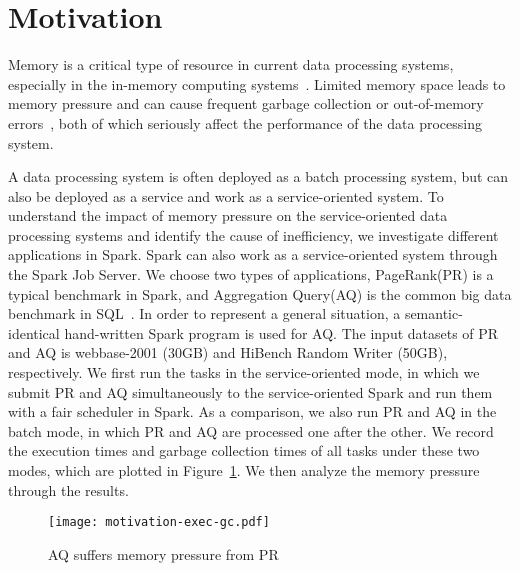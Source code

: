 \section{Motivation}
\label{sec:motivation}

Memory is a critical type of resource in current data processing systems, especially in the in-memory computing systems~\cite{shi:mammoth}. Limited memory space leads to memory pressure and can cause frequent garbage collection or out-of-memory errors~\cite{fang2015interruptible}, both of which seriously affect the performance of the data processing system.

A data processing system is often deployed as a batch processing system, but can also be deployed as a service and work as a service-oriented system. To understand the impact of memory pressure on the service-oriented data processing systems and identify the cause of inefficiency, we investigate different applications in Spark. Spark can also work as a service-oriented system through the Spark Job Server. We choose two types of applications, PageRank(PR)  
is a typical benchmark in Spark, and Aggregation Query(AQ) is the common big data benchmark in SQL~\cite{www:benchmark}. In order to represent a general situation, a semantic-identical hand-written Spark program is used for AQ. The input datasets of PR and AQ is webbase-2001 (30GB) and HiBench Random Writer (50GB), respectively. We first run the tasks in the service-oriented mode, in which we submit PR and AQ simultaneously to the service-oriented Spark and run them with a fair scheduler in Spark. As a comparison, we also run PR and AQ in the batch mode, in which PR and AQ are processed one after the other. We record the execution times and garbage collection times of all tasks under these two modes, which are plotted in Figure~\ref{fig:memorypressure}. We then analyze the  memory pressure through the results.   

\begin{figure}[!t]
\centering
\texttt{[image: motivation-exec-gc.pdf]}
\vspace{-2mm}
\caption{AQ suffers memory pressure from PR}
\vspace{-6mm}
\label{fig:memorypressure}
\end{figure}

